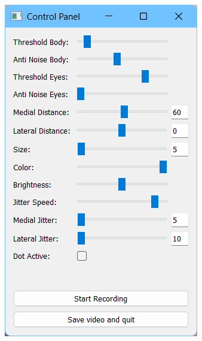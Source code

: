 \documentclass[12pt]{article}
\begin{document}
\begin{minipage}[t]{0.45\textwidth}
	\vspace{0pt}
	\includegraphics*[width=\textwidth]{images/axtrack.png}
\end{minipage}
\end{document}

